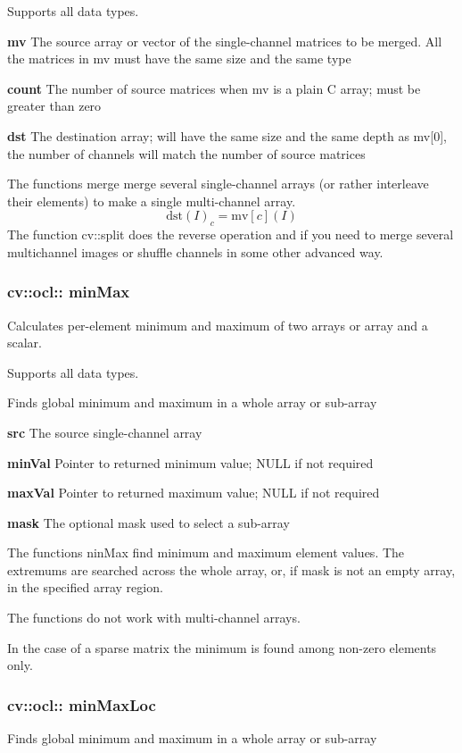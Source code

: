 \documentclass{article}
\begin{document}
Supports all data types.

\textbf{mv }The source array or vector of the single-channel matrices to be
merged. All the matrices in mv must have the same size and the same type

\textbf{count }The number of source matrices when mv is a plain C array;
must be greater than zero

\textbf{dst }The destination array; will have the same size and the same
depth as mv[0], the number of channels will match the number of source
matrices

The functions merge merge several single-channel arrays (or rather
interleave their elements) to make a single multi-channel array.
\[
\mbox{dst}(I)_c =\mbox{mv}\left[ c \right](I)
\]
The function cv::split does the reverse operation and if you need to merge
several multichannel images or shuffle channels in some other advanced way.

\newpage

\subsubsection{cv::ocl:: minMax }
\label{subsubsec:mylabel21}
Calculates per-element minimum and maximum of two arrays or array and a
scalar.

Supports all data types.

Finds global minimum and maximum in a whole array or sub-array

\textbf{src }The source single-channel array

\textbf{minVal }Pointer to returned minimum value; NULL if not required

\textbf{maxVal }Pointer to returned maximum value; NULL if not required

\textbf{mask }The optional mask used to select a sub-array

The functions ninMax find minimum and maximum element values. The extremums
are searched across the whole array, or, if mask is not an empty array, in
the specified array region.

The functions do not work with multi-channel arrays.

In the case of a sparse matrix the minimum is found among non-zero elements
only.

\newpage

\subsubsection{cv::ocl:: minMaxLoc }
\label{subsubsec:mylabel22}
Finds global minimum and maximum in a whole array or sub-array
\end{document}
